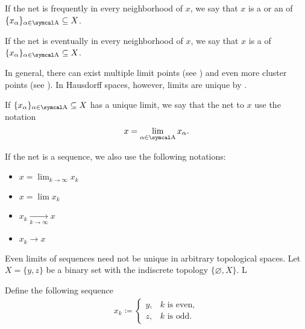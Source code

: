 \begin{proposition}
\begin{definition}
  \begin{defenum}
     If the net is frequently in every neighborhood of \( x \), we say that \( x \) is a  or an  of \( \{ x_\al \}_{\al \in \CA} \subseteq X \).

     If the net is eventually in every neighborhood of \( x \), we say that \( x \) is a  of \( \{ x_\al \}_{\al \in \CA} \subseteq X \).
  \end{defenum}

  In general, there can exist multiple limit points (see ) and even more cluster points (see ). In Hausdorff spaces, however, limits are unique by .

  If \( \{ x_\al \}_{\al \in \CA} \subseteq X \) has a unique limit, we say that the net  to \( x \) use the notation
  \begin{equation*}
    x = \lim_{\al \in \CA} x_\al.
  \end{equation*}

  If the net is a sequence, we also use the following notations:
  \begin{itemize}
    \item \( x = \lim_{k \to \infty} x_k \)
    \item \( x = \lim x_k \)
    \item \( x_k \xrightarrow[k \to \infty]{} x \)
    \item \( x_k \to x \)
  \end{itemize}
\end{definition}

\begin{example}\label{ex:multiple_limit_points_of_net}
  Even limits of sequences need not be unique in arbitrary topological spaces. Let \( X = \{ y, z \} \) be a binary set with the indiscrete topology \( \{ \varnothing, X \} \). L

  Define the following sequence
  \begin{align*}
    x_k \coloneqq \begin{cases}
      y, &k \text{ is even}, \\
      z, &k \text{ is odd}.
    \end{cases}
  \end{align*}


\end{example}
\end{proposition}
